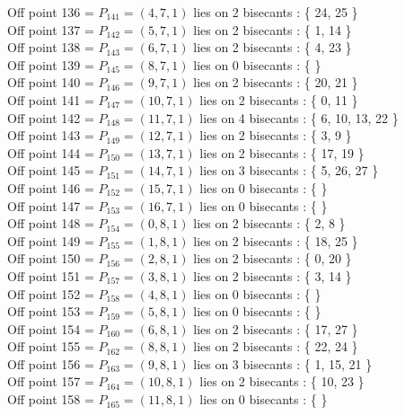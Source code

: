 \documentclass{article}
\begin{document}
{Off point 136 = $P_{141} = ( 4, 7, 1 )$ lies on 2 bisecants : \{ 24, 25 \}\\
Off point 137 = $P_{142} = ( 5, 7, 1 )$ lies on 2 bisecants : \{ 1, 14 \}\\
Off point 138 = $P_{143} = ( 6, 7, 1 )$ lies on 2 bisecants : \{ 4, 23 \}\\
Off point 139 = $P_{145} = ( 8, 7, 1 )$ lies on 0 bisecants : \{  \}\\
Off point 140 = $P_{146} = ( 9, 7, 1 )$ lies on 2 bisecants : \{ 20, 21 \}\\
Off point 141 = $P_{147} = ( 10, 7, 1 )$ lies on 2 bisecants : \{ 0, 11 \}\\
Off point 142 = $P_{148} = ( 11, 7, 1 )$ lies on 4 bisecants : \{ 6, 10, 13, 22 \}\\
Off point 143 = $P_{149} = ( 12, 7, 1 )$ lies on 2 bisecants : \{ 3, 9 \}\\
Off point 144 = $P_{150} = ( 13, 7, 1 )$ lies on 2 bisecants : \{ 17, 19 \}\\
Off point 145 = $P_{151} = ( 14, 7, 1 )$ lies on 3 bisecants : \{ 5, 26, 27 \}\\
Off point 146 = $P_{152} = ( 15, 7, 1 )$ lies on 0 bisecants : \{  \}\\
Off point 147 = $P_{153} = ( 16, 7, 1 )$ lies on 0 bisecants : \{  \}\\
Off point 148 = $P_{154} = ( 0, 8, 1 )$ lies on 2 bisecants : \{ 2, 8 \}\\
Off point 149 = $P_{155} = ( 1, 8, 1 )$ lies on 2 bisecants : \{ 18, 25 \}\\
Off point 150 = $P_{156} = ( 2, 8, 1 )$ lies on 2 bisecants : \{ 0, 20 \}\\
Off point 151 = $P_{157} = ( 3, 8, 1 )$ lies on 2 bisecants : \{ 3, 14 \}\\
Off point 152 = $P_{158} = ( 4, 8, 1 )$ lies on 0 bisecants : \{  \}\\
Off point 153 = $P_{159} = ( 5, 8, 1 )$ lies on 0 bisecants : \{  \}\\
Off point 154 = $P_{160} = ( 6, 8, 1 )$ lies on 2 bisecants : \{ 17, 27 \}\\
Off point 155 = $P_{162} = ( 8, 8, 1 )$ lies on 2 bisecants : \{ 22, 24 \}\\
Off point 156 = $P_{163} = ( 9, 8, 1 )$ lies on 3 bisecants : \{ 1, 15, 21 \}\\
Off point 157 = $P_{164} = ( 10, 8, 1 )$ lies on 2 bisecants : \{ 10, 23 \}\\
Off point 158 = $P_{165} = ( 11, 8, 1 )$ lies on 0 bisecants : \{  \}\\
}
\end{document}
